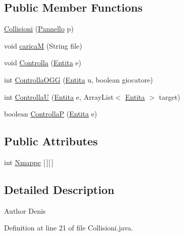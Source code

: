 \subsection*{Public Member Functions}
\begin{DoxyCompactItemize}
\item 
\hyperlink{classa_1_1survival_1_1game_1_1_collisioni_a65b3180595586bc591f7689883e01c7e}{Collisioni} (\hyperlink{classa_1_1survival_1_1game_1_1_pannello}{Pannello} p)
\item 
void \hyperlink{classa_1_1survival_1_1game_1_1_collisioni_a373d83d9b42d31e72ccc982a3fd85ea9}{caricaM} (String file)
\item 
void \hyperlink{classa_1_1survival_1_1game_1_1_collisioni_a839c38fa5d30f0458af3dcf4bf04f358}{Controlla} (\hyperlink{class_entita_1_1_entita}{Entita} e)
\item 
int \hyperlink{classa_1_1survival_1_1game_1_1_collisioni_ad38c8b3c50bbbd655ef3f9e2c80b21e0}{Controlla\+O\+GG} (\hyperlink{class_entita_1_1_entita}{Entita} u, boolean giocatore)
\item 
int \hyperlink{classa_1_1survival_1_1game_1_1_collisioni_a87a22cc62f824d7a4e9a017a9b36b019}{ControllaU} (\hyperlink{class_entita_1_1_entita}{Entita} e, Array\+List$<$ \hyperlink{class_entita_1_1_entita}{Entita} $>$ target)
\item 
boolean \hyperlink{classa_1_1survival_1_1game_1_1_collisioni_ab8b33fe794da631b2ee55f7b77bf31d5}{ControllaP} (\hyperlink{class_entita_1_1_entita}{Entita} e)
\end{DoxyCompactItemize}
\subsection*{Public Attributes}
\begin{DoxyCompactItemize}
\item 
int \hyperlink{classa_1_1survival_1_1game_1_1_collisioni_ac67a253aa050f8b036b79e9613b946e9}{Nmappe} \mbox{[}$\,$\mbox{]}\mbox{[}$\,$\mbox{]}
\end{DoxyCompactItemize}


\subsection{Detailed Description}
\begin{DoxyAuthor}{Author}
Denis 
\end{DoxyAuthor}


Definition at line 21 of file Collisioni.\+java.



